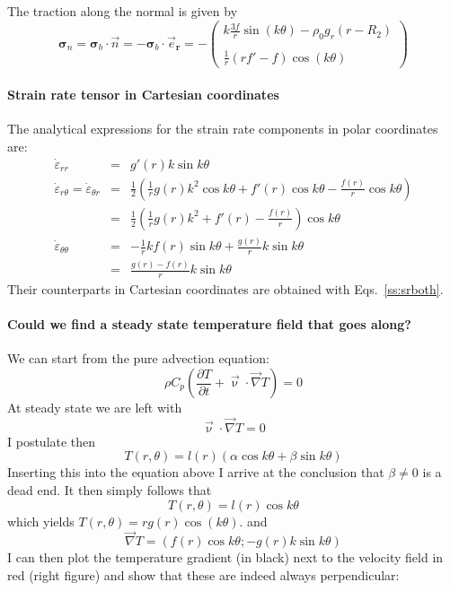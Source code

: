 The traction along the normal is given by
\[
{\bm \sigma}_n 
= {\bm \sigma}_b \cdot {\vec n}
= -{\bm \sigma}_b \cdot {\vec e}_{\bm r}
= - \left(
\begin{array}{c}
 k \frac{3f}{r} \sin(k \theta) - \rho_0 g_r (r-R_2) \\  \\
\frac{1}{r} (rf'   - f) \cos(k\theta)    
\end{array}
\right)
\]

\paragraph{Strain rate tensor in Cartesian coordinates} 
The analytical expressions for the strain rate components in polar coordinates 
are:
\begin{eqnarray}
\dot{\varepsilon}_{rr}&=& g'(r) k \sin k\theta \\
\dot{\varepsilon}_{r\theta}=
\dot{\varepsilon}_{\theta r}&=&
\frac{1}{2}\left(
\frac{1}{r} g(r) k^2 \cos k\theta + f'(r) \cos k\theta - \frac{f(r)}{r} \cos k\theta
\right)\\
&=& \frac{1}{2}
\left(
\frac{1}{r} g(r) k^2  + f'(r) - \frac{f(r)}{r} 
\right) \cos k\theta \\
\dot{\varepsilon}_{\theta \theta} 
&=& -\frac{1}{r} k f(r) \sin k\theta + \frac{g(r)}{r}  k \sin k\theta\\
 &=& \frac{g(r)-f(r)}{r} k \sin k\theta
\end{eqnarray}
Their counterparts in Cartesian coordinates are obtained with Eqs.~\eqref{ss:srboth}.

\paragraph{Could we find a steady state temperature field that goes along?}
We can start from the pure advection equation:
\[
\rho C_p \left(\frac{\partial T}{\partial t} + \vec\upnu\cdot \vec\nabla T \right) = 0
\]
At steady state we are left with 
\[
\vec\upnu\cdot \vec\nabla T = 0
\]
I postulate then 
\[
T(r,\theta) = l(r) (\alpha \cos k\theta + \beta \sin k\theta)
\]
Inserting this into the equation above I arrive at the conclusion that $\beta \neq 0$ is a dead end. 
It then simply follows that 
\[
T(r,\theta) = l(r) \cos k\theta 
\]
which yields $T(r,\theta)=r g(r) \cos(k\theta)$. 
and 
\[
\vec\nabla T = ( f(r) \cos k\theta ; - g(r) k \sin k\theta)
\]
I can then plot the temperature gradient (in black) next to the velocity field in red (right figure)
and show that these are indeed always perpendicular:

